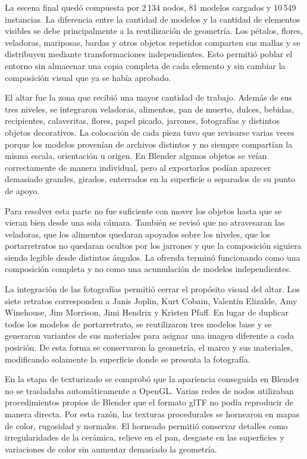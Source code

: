 \documentclass[letter,12pt]{article}
\begin{document}
La escena final quedó compuesta por 2\,134 nodos, 81 modelos cargados y 10\,549 instancias. La diferencia entre la cantidad de modelos y la cantidad de elementos visibles se debe principalmente a la reutilización de geometría. Los pétalos, flores, veladoras, mariposas, bardas y otros objetos repetidos comparten sus mallas y se distribuyen mediante transformaciones independientes. Esto permitió poblar el entorno sin almacenar una copia completa de cada elemento y sin cambiar la composición visual que ya se había aprobado.

El altar fue la zona que recibió una mayor cantidad de trabajo. Además de sus tres niveles, se integraron veladoras, alimentos, pan de muerto, dulces, bebidas, recipientes, calaveritas, flores, papel picado, jarrones, fotografías y distintos objetos decorativos. La colocación de cada pieza tuvo que revisarse varias veces porque los modelos provenían de archivos distintos y no siempre compartían la misma escala, orientación u origen. En Blender algunos objetos se veían correctamente de manera individual, pero al exportarlos podían aparecer demasiado grandes, girados, enterrados en la superficie o separados de su punto de apoyo.

Para resolver esta parte no fue suficiente con mover los objetos hasta que se vieran bien desde una sola cámara. También se revisó que no atravesaran las veladoras, que los alimentos quedaran apoyados sobre los niveles, que los portarretratos no quedaran ocultos por los jarrones y que la composición siguiera siendo legible desde distintos ángulos. La ofrenda terminó funcionando como una composición completa y no como una acumulación de modelos independientes.

La integración de las fotografías permitió cerrar el propósito visual del altar. Los siete retratos corresponden a Janis Joplin, Kurt Cobain, Valentín Elizalde, Amy Winehouse, Jim Morrison, Jimi Hendrix y Kristen Pfaff. En lugar de duplicar todos los modelos de portarretrato, se reutilizaron tres modelos base y se generaron variantes de sus materiales para asignar una imagen diferente a cada posición. De esta forma se conservaron la geometría, el marco y sus materiales, modificando solamente la superficie donde se presenta la fotografía.

En la etapa de texturizado se comprobó que la apariencia conseguida en Blender no se trasladaba automáticamente a OpenGL. Varias redes de nodos utilizaban procedimientos propios de Blender que el formato glTF no podía reproducir de manera directa. Por esta razón, las texturas procedurales se hornearon en mapas de color, rugosidad y normales. El horneado permitió conservar detalles como irregularidades de la cerámica, relieve en el pan, desgaste en las superficies y variaciones de color sin aumentar demasiado la geometría.
\end{document}
